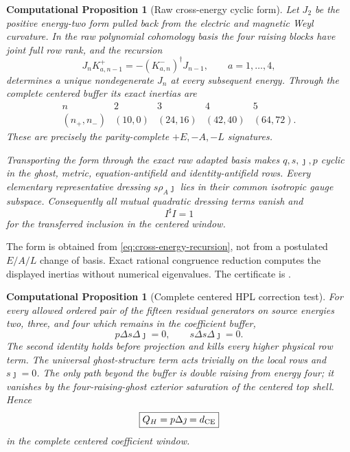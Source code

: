 \documentclass[11pt]{article}
\newtheorem{cproposition}[theorem]{Computational Proposition}
\theoremstyle{definition}
\theoremstyle{remark}
\begin{document}
\begin{cproposition}[Raw cross-energy cyclic form]
\label{prop:raw-cross-energy}
Let $J_2$ be the positive energy-two form pulled back from the electric and
magnetic Weyl curvature.  In the raw polynomial cohomology basis the four
raising blocks have joint full row rank, and the recursion
\begin{equation}\label{eq:cross-energy-recursion}
 J_nK^+_{a,n-1}=-(K^-_{a,n})^\dagger J_{n-1},
 \qquad a=1,\ldots,4,
\end{equation}
determines a unique nondegenerate $J_n$ at every subsequent energy.  Through
the complete centered buffer its exact inertias are
\begin{equation}
\begin{array}{c|rrrr}
n&2&3&4&5\\ \hline
(n_+,n_-)&(10,0)&(24,16)&(42,40)&(64,72).
\end{array}
\end{equation}
These are precisely the parity-complete $+E,-A,-L$ signatures.

Transporting the form through the exact raw adapted basis makes
$q,s,\jmath,p$ cyclic in the ghost, metric, equation-antifield and
identity-antifield rows.  Every elementary representative dressing
$s\rho_A\jmath$ lies in their common isotropic gauge subspace.  Consequently
all mutual quadratic dressing terms vanish and
\begin{equation}
 I^\sharp I=1
\end{equation}
for the transferred inclusion in the centered window.
\end{cproposition}

The form is obtained from \eqref{eq:cross-energy-recursion}, not from a
postulated $E/A/L$ change of basis.  Exact rational congruence reduction
computes the displayed inertias without numerical eigenvalues.  The
certificate is
.

\begin{cproposition}[Complete centered HPL correction test]
\label{prop:full-HPL-test}
For every allowed ordered pair of the fifteen residual generators on source
energies two, three, and four which remains in the coefficient buffer,
\begin{equation}
 p\Delta s\Delta\jmath=0,
 \qquad
 s\Delta s\Delta\jmath=0.
\end{equation}
The second identity holds before projection and kills every higher physical
row term.  The universal ghost-structure term acts trivially on the local
rows and $s\jmath=0$.  The only path beyond the buffer is double raising from
energy four; it vanishes by the four-raising-ghost exterior saturation of
the centered top shell.  Hence
\begin{equation}
 \boxed{Q_H=p\Delta\jmath=d_{\rm CE}}
\end{equation}
in the complete centered coefficient window.
\end{cproposition}
\end{document}
